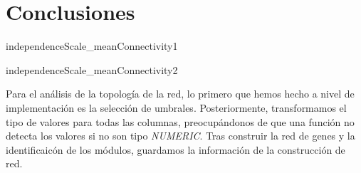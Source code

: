 \section{Conclusiones}


\caption{independenceScale_meanConnectivity1}
\label{fig:sample_clustering}


\caption{independenceScale_meanConnectivity2}
\label{fig:sample_clustering}

Para el análisis de la topología de la red, lo primero que hemos hecho a nivel de implementación es la selección de umbrales. Posteriormente, transformamos el tipo de valores para todas las columnas, preocupándonos de que una función no detecta los valores si no son tipo \textit{NUMERIC}. Tras construir la red de genes y la identificaicón de los módulos, guardamos la información de la construcción de red.

